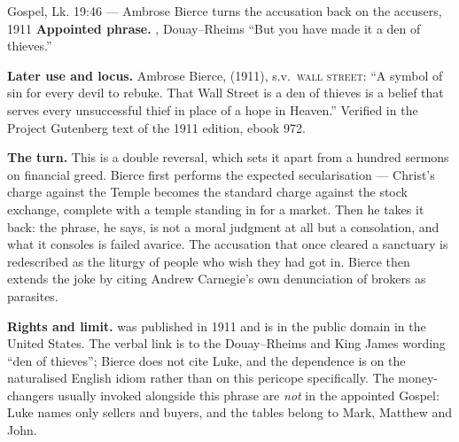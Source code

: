 \begin{afterlife}{Gospel, Lk. 19:46 --- Ambrose Bierce turns the accusation back on the accusers, 1911}
\textbf{Appointed phrase.} , Douay--Rheims ``But you have made it a den of thieves.''

\textbf{Later use and locus.} Ambrose Bierce, 
(1911), s.v.\ \textsc{wall street}: ``A symbol of sin for every devil to
rebuke. That Wall Street is a den of thieves is a belief that serves every
unsuccessful thief in place of a hope in Heaven.'' Verified in the Project
Gutenberg text of the 1911 edition, ebook 972.

\textbf{The turn.} This is a double reversal, which sets it apart from a
hundred sermons on financial greed. Bierce first performs the
expected secularisation --- Christ's charge against the Temple becomes the
standard charge against the stock exchange, complete with a temple standing in
for a market. Then he takes it back: the phrase, he says, is not a moral
judgment at all but a consolation, and what it consoles is failed avarice. The
accusation that once cleared a sanctuary is redescribed as the liturgy of
people who wish they had got in. Bierce then extends the joke by citing
Andrew Carnegie's own denunciation of brokers as parasites.

\textbf{Rights and limit.}  was published in 1911
and is in the public domain in the United States. The verbal link is to the
Douay--Rheims and King James wording ``den of thieves''; Bierce does not cite Luke, and
the dependence is on the naturalised English idiom rather than on this
pericope specifically. The money-changers usually invoked alongside this
phrase are \textit{not} in the appointed Gospel: Luke names only
sellers and buyers, and the tables belong to Mark, Matthew and John.
\end{afterlife}

